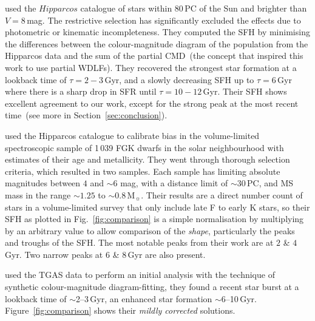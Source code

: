 \documentclass[fleqn,usenatbib]{mnras}
\begin{document}
\textit{\citet{2006A&A...459..783C}} used the $Hipparcos$ catalogue of stars
within 80\,PC of the Sun and brighter than $V=8$\,mag. The restrictive selection
has significantly excluded the effects due to photometric or kinematic
incompleteness. They computed the SFH by minimising the differences between the
colour-magnitude diagram of the population from the Hipparcos data and the
sum of the partial CMD~(the concept that inspired this work to use partial
WDLFs). They recovered the strongest star formation at a lookback time of
$\tau=2-3$\,Gyr, and a slowly decreasing SFH up to $\tau=6$\,Gyr where there is
a sharp drop in SFR until $\tau=10-12$\,Gyr. Their SFH shows excellent agreement
to our work, except for the strong peak at the most recent time~(see more in
Section~\ref{sec:conclusion}).

\textit{\citet{2007ApJ...665..767R}} used the Hipparcos catalogue to calibrate
bias in the \citep{2005ApJS..159..141V} volume-limited spectroscopic
sample of 1\,039 FGK dwarfs in the solar neighbourhood with estimates of
their age and metallicity. They went through thorough selection criteria,
which resulted in two samples. Each sample has limiting absolute magnitudes
between $4$ and $\sim$6 mag, with a distance limit of $\sim$30\,PC, and MS mass
in the range $\sim1.25$ to $\sim0.8$\,M$_{\sun}$. Their results are a direct
number count of stars in a volume-limited survey that only include late F to
early K stars, so their SFH as plotted in Fig.~\ref{fig:comparison} is a simple
normalisation by multiplying by an arbitrary value to allow comparison of the
\textit{shape}, particularly the peaks and troughs of the SFH. The most notable
peaks from their work are at $2$ \& $4$\,Gyr. Two narrow peaks at $6$ \&
$8$\,Gyr are also present.

\textit{\citet{2018IAUS..330..148B}} used the TGAS data to perform an initial
analysis with the technique of synthetic colour-magnitude diagram-fitting, they
found a recent star burst at a lookback time of $\sim$2--3\,Gyr, an enhanced
star formation $\sim$6--10\,Gyr. Figure~\ref{fig:comparison} shows their
\textit{mildly corrected} solutions.
\end{document}
